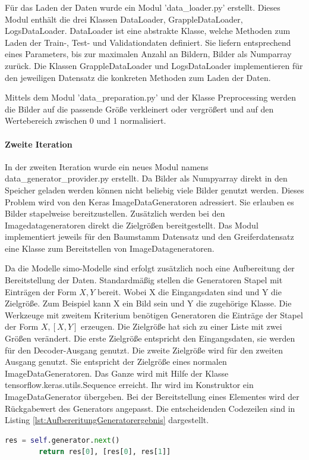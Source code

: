 	Für das Laden der Daten wurde ein Modul 'data\_loader.py' erstellt. Dieses Modul enthält die drei Klassen DataLoader, GrappleDataLoader, LogsDataLoader. DataLoader ist eine abstrakte Klasse, welche Methoden zum Laden der Train-, Test- und Validationdaten definiert. Sie liefern entsprechend eines Parameters, bis zur maximalen Anzahl an Bildern, Bilder als Numparray zurück. Die Klassen GrappleDataLoader und LogsDataLoader implementieren für den jeweiligen Datensatz die konkreten Methoden zum Laden der Daten.
	
	Mittels dem Modul 'data\_preparation.py' und der Klasse Preprocessing werden die Bilder auf die passende Größe verkleinert oder vergrößert und auf den Wertebereich zwischen 0 und 1 normalisiert.
	
	\paragraph{Zweite Iteration} 
	In der zweiten Iteration wurde ein neues Modul namens data\_generator\_provider.py erstellt. Da Bilder als Numpyarray direkt in den Speicher geladen werden können nicht beliebig viele Bilder genutzt werden. Dieses Problem wird von den Keras ImageDataGeneratoren \cite{Chollet.2015} adressiert. Sie erlauben es Bilder stapelweise bereitzustellen. Zusätzlich werden bei den Imagedatageneratoren direkt die Zielgrößen bereitgestellt. Das Modul implementiert jeweils für den Baumstamm Datensatz und den Greiferdatensatz eine Klasse zum Bereitstellen von ImageDatageneratoren.
	
	Da die Modelle \ac{simo}-Modelle sind erfolgt zusätzlich noch eine Aufbereitung der Bereitstellung der Daten. Standardmäßig stellen die Generatoren Stapel mit Einträgen der Form $X ,Y$  bereit. Wobei X die Eingangsdaten sind und Y die Zielgröße. Zum Beispiel kann X ein Bild sein und Y die zugehörige Klasse. Die Werkzeuge mit zweitem Kriterium benötigen Generatoren die Einträge der Stapel der Form $X, [X, Y]$ erzeugen. Die Zielgröße hat sich zu einer Liste mit zwei Größen verändert. Die erste Zielgröße entspricht den Eingangsdaten, sie werden für den Decoder-Ausgang genutzt. Die zweite Zielgröße wird für den zweiten Ausgang genutzt. Sie entspricht der Zielgröße eines normalen ImageDataGeneratoren. Das Ganze wird mit Hilfe der Klasse tensorflow.keras.utils.Sequence erreicht. Ihr wird im Konstruktor ein ImageDataGenerator übergeben. Bei der Bereitstellung eines Elementes wird der Rückgabewert des Generators angepasst. Die entscheidenden Codezeilen sind in Listing \ref{lst:AufbereritungGeneratorergebnis} dargestellt. 
	\begin{lstlisting}[language=python,caption=Aufbereitung Generatorergebnis in Python, label=lst:AufbereritungGeneratorergebnis]
		res = self.generator.next()
		return res[0], [res[0], res[1]]
	\end{lstlisting}
	

